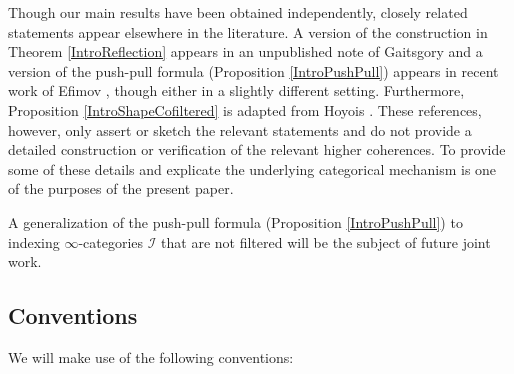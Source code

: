 \documentclass[a4paper,reqno,10pt]{amsart}
\theoremstyle{definition}
\theoremstyle{remark}
\newcommand{\I}{\mathcal{I}}
\begin{document}
Though our main results have been obtained independently, closely related statements appear elsewhere in the literature. A version of the construction in Theorem \ref{IntroReflection} appears in an unpublished note of Gaitsgory \cite[Lemma 1.3.6]{Gaitsgory} and a version of  the push-pull formula (Proposition \ref{IntroPushPull}) appears in recent work of Efimov \cite[Proposition 1.66,2)]{Efimov}, though either in a slightly different setting. Furthermore, Proposition \ref{IntroShapeCofiltered} is adapted from Hoyois \cite[Proposition 2.11, (1)]{Hoyois}. These references, however, only assert or sketch the relevant statements and do not provide a detailed construction or verification of the relevant higher coherences. To provide some of these details and explicate the underlying categorical mechanism is one of the purposes of the present paper.

A generalization of the push-pull formula (Proposition \ref{IntroPushPull}) to indexing $\infty$-categories $\I$ that are not filtered will be the subject of future joint work.

\subsection*{Conventions}

We will make use of the following conventions:
\end{document}
